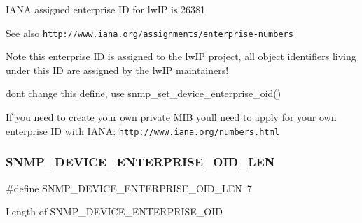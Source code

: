 I\+A\+NA assigned enterprise ID for lw\+IP is 26381 \begin{DoxySeeAlso}{See also}
\href{http://www.iana.org/assignments/enterprise-numbers}{\tt http\+://www.\+iana.\+org/assignments/enterprise-\/numbers}
\end{DoxySeeAlso}
\begin{DoxyNote}{Note}
this enterprise ID is assigned to the lw\+IP project, all object identifiers living under this ID are assigned by the lw\+IP maintainers! 

don\textquotesingle{}t change this define, use snmp\+\_\+set\+\_\+device\+\_\+enterprise\+\_\+oid()
\end{DoxyNote}
If you need to create your own private M\+IB you\textquotesingle{}ll need to apply for your own enterprise ID with I\+A\+NA\+: \href{http://www.iana.org/numbers.html}{\tt http\+://www.\+iana.\+org/numbers.\+html} \mbox{\label{group__snmp__opts_ga9e39ba5308f5c7ac5296c7d05fdfa97f}} 
\subsubsection{\texorpdfstring{S\+N\+M\+P\+\_\+\+D\+E\+V\+I\+C\+E\+\_\+\+E\+N\+T\+E\+R\+P\+R\+I\+S\+E\+\_\+\+O\+I\+D\+\_\+\+L\+EN}{SNMP\_DEVICE\_ENTERPRISE\_OID\_LEN}\hspace{0.1cm}{\footnotesize\ttfamily [1/2]}}
{\footnotesize\ttfamily \#define S\+N\+M\+P\+\_\+\+D\+E\+V\+I\+C\+E\+\_\+\+E\+N\+T\+E\+R\+P\+R\+I\+S\+E\+\_\+\+O\+I\+D\+\_\+\+L\+EN~7}

Length of S\+N\+M\+P\+\_\+\+D\+E\+V\+I\+C\+E\+\_\+\+E\+N\+T\+E\+R\+P\+R\+I\+S\+E\+\_\+\+O\+ID \mbox{\label{group__snmp__opts_ga9e39ba5308f5c7ac5296c7d05fdfa97f}} 
